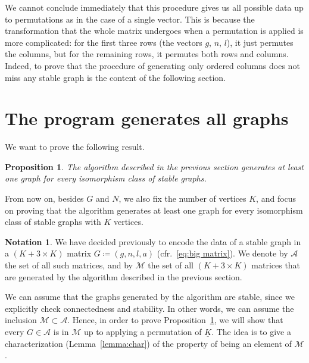 \documentclass{amsart}
\theoremstyle{plain}
\newtheorem{proposition}[theorem]{Proposition}
\theoremstyle{definition}
\newtheorem{notation}[theorem]{Notation}
\newcommand{\ubar}[1]{\underline{#1}}
\begin{document}
We cannot conclude immediately that this procedure gives us all
possible data up to permutations as in the case of a single
vector. This is because the transformation that the whole matrix
undergoes when a permutation is applied is more complicated: for the
first three rows (the vectors $g$, $n$, $l$), it just permutes the columns,
but for the remaining rows, it permutes both rows and columns. Indeed,
to prove that the procedure of generating only ordered columns does
not miss any stable graph is the content of the following section.



\section{The program generates all graphs}\label{sec:proof}

We want to prove the following result.

\begin{proposition}\label{prop:main}
  The algorithm described in the previous section generates at least
  one graph for every isomorphism class of stable graphs.
\end{proposition}

From now on, besides $G$ and $N$, we also fix the number of vertices
$K$, and focus on proving that the algorithm generates at least one
graph for every isomorphism class of stable graphs with $K$ vertices.


\begin{notation}
  We have decided previously to encode the data of a stable graph in a
  $(K+3 \times K)$ matrix $G \coloneqq (g, n, l, a)$
  (cfr.~\eqref{eq:big matrix}). We denote by $\mathcal{A}$ the set of
  all such matrices, and by $\mathcal{M}$ the set of all $(K+3 \times
  K)$ matrices that are generated by the algorithm described in the
  previous section.
\end{notation}

We can assume that the graphs generated by the algorithm are stable,
since we explicitly check connectedness and stability. In other words,
we can assume the inclusion $\mathcal{M} \subset \mathcal{A}$. Hence,
in order to prove Proposition~\ref{prop:main}, we will show that every
$G \in \mathcal{A}$ is in $\mathcal{M}$ up to applying a permutation
of $\ubar{K}$. The idea is to give a characterization
(Lemma~\ref{lemma:char}) of the property of being an element of
$\mathcal{M}$.
\end{document}
